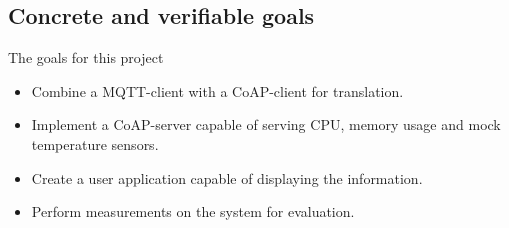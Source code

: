 \subsection{Concrete and verifiable goals}
\label{ch:intro:verifiable-goals}
The goals for this project
\begin{itemize}
    \item Combine a MQTT-client with a CoAP-client for translation.
    \item Implement a CoAP-server capable of serving CPU, memory usage and mock temperature sensors.
    \item Create a user application capable of displaying the information.
    \item Perform measurements on the system for evaluation.
\end{itemize}






